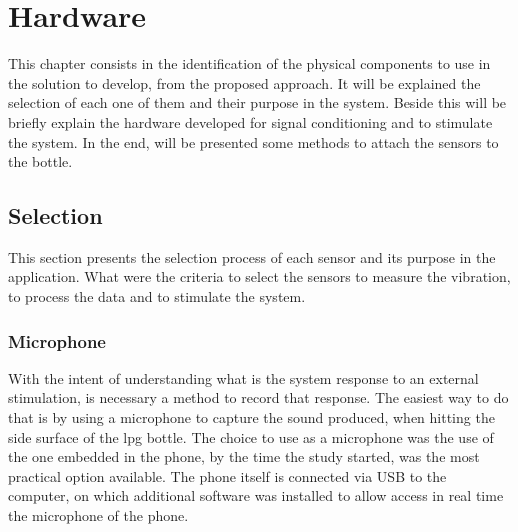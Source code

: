 \cleardoublepage
\chapter{Hardware}\label{chap:hardware}



This chapter consists in the identification of the physical components to use in the solution to develop, from the proposed approach. It will be explained the selection of each one of them and their purpose in the system. Beside this will be briefly explain the hardware developed for signal conditioning and to stimulate the system. In the end, will be presented some methods to attach the sensors to the bottle.
\section{Selection}
This section presents the selection process of each sensor and its purpose in the application. What were the criteria to select the sensors to measure the vibration,  to process the data and to stimulate the system. 
\subsection{Microphone}
With the intent of understanding what is the system response to an external stimulation, is necessary a method to record that response. The easiest way to do that is by using a microphone to capture the sound produced, when hitting the side surface of the \acrshort{lpg} bottle.
 The choice to use as a microphone was the use of the one embedded in the phone, by the time the study started, was the most practical option available. The phone itself is connected via USB to the computer, on which additional software was installed to allow access in real time the microphone of the phone.  

